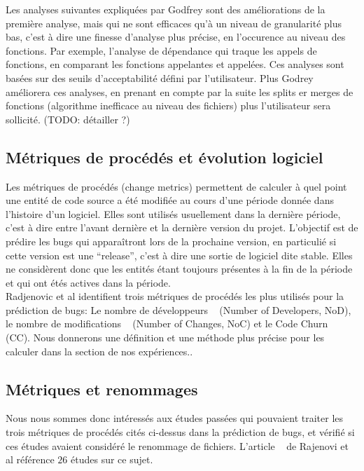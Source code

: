 Les analyses suivantes expliquées par Godfrey sont des améliorations de la première analyse, mais qui ne sont efficaces qu'à un niveau de granularité plus bas, c'est à dire une finesse d'analyse plus précise, en l'occurence au niveau des fonctions. Par exemple, l'analyse de dépendance qui traque les appels de fonctions, en comparant les fonctions appelantes et appelées. Ces analyses sont basées sur des seuils d'acceptabilité défini par l'utilisateur. Plus Godrey améliorera ces analyses, en prenant en compte par la suite les splits er merges de fonctions (algorithme inefficace au niveau des fichiers) plus l'utilisateur sera sollicité. (TODO: détailler ?)\\

\subsection{Métriques de procédés et évolution logiciel}
Les métriques de procédés (change metrics) permettent de calculer à quel point une entité de code source a été modifiée au cours d'une période donnée dans l'histoire d'un logiciel. Elles sont utilisés usuellement dans la dernière période, c'est à dire entre l'avant dernière et la dernière version du projet. L'objectif est de prédire les bugs qui apparaîtront lors de la prochaine version, en particulié si cette version est une ``release'', c'est à dire une sortie de logiciel dite stable. Elles ne considèrent donc que les entités étant toujours présentes à la fin de la période et qui ont étés actives dans la période.\\
Radjenovic et al \cite{radjenovic_software_2013} identifient trois métriques de procédés les plus utilisés pour la prédiction de bugs: Le nombre de développeurs ~\cite{weyuker_too_2008} (Number of Developers, NoD), le nombre de modifications ~\cite{graves_predicting_2000} (Number of Changes, NoC) et le Code Churn ~\cite{munson_code_1998} (CC). Nous donnerons une définition et une méthode plus précise pour les calculer dans la section de nos expériences..\\

\subsection{Métriques et renommages}
Nous nous sommes donc intéressés aux études passées qui pouvaient traiter les trois métriques de procédés cités ci-dessus dans la prédiction de bugs, et vérifié si ces études avaient considéré le renommage de fichiers. L'article ~\cite{radjenovic_software_2013} de Rajenovi et al référence $26$ études sur ce sujet.\\

